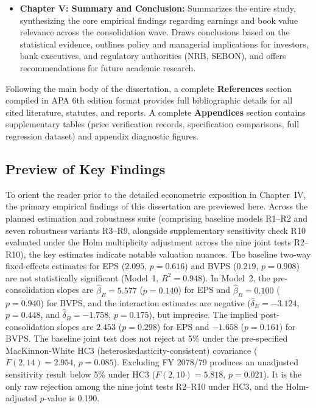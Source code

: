\begin{itemize}
\item \textbf{Chapter V: Summary and Conclusion:} Summarizes the entire study, synthesizing the core empirical findings regarding earnings and book value relevance across the consolidation wave. Draws conclusions based on the statistical evidence, outlines policy and managerial implications for investors, bank executives, and regulatory authorities (NRB, SEBON), and offers recommendations for future academic research.
\end{itemize}

Following the main body of the dissertation, a complete \textbf{References} section compiled in APA 6th edition format provides full bibliographic details for all cited literature, statutes, and reports. A complete \textbf{Appendices} section contains supplementary tables (price verification records, specification comparisons, full regression dataset) and appendix diagnostic figures.

\subsection{Preview of Key Findings}

To orient the reader prior to the detailed econometric exposition in Chapter~IV, the primary empirical findings of this dissertation are previewed here. Across the planned estimation and robustness suite (comprising baseline models R1--R2 and seven robustness variants R3--R9, alongside supplementary sensitivity check R10 evaluated under the Holm multiplicity adjustment across the nine joint tests R2--R10), the key estimates indicate notable valuation nuances. The baseline two-way fixed-effects estimates for EPS ($2.095$, $p=0.616$) and BVPS ($0.219$, $p=0.908$) are not statistically significant (Model~1, $R^2 = 0.948$). In Model~2, the pre-consolidation slopes are $\hat{\beta}_E = 5.577$ ($p=0.140$) for EPS and $\hat{\beta}_B = 0.100$ ($p=0.940$) for BVPS, and the interaction estimates are negative ($\hat{\delta}_E=-3.124$, $p=0.448$, and $\hat{\delta}_B=-1.758$, $p=0.175$), but imprecise. The implied post-consolidation slopes are $2.453$ ($p=0.298$) for EPS and $-1.658$ ($p=0.161$) for BVPS. The baseline joint test does not reject at 5\% under the pre-specified MacKinnon-White HC3 (heteroskedasticity-consistent) covariance ($F(2,14)=2.954$, $p=0.085$). Excluding FY 2078/79 produces an unadjusted sensitivity result below 5\% under HC3 ($F(2,10)=5.818$, $p=0.021$). It is the only raw rejection among the nine joint tests R2--R10 under HC3, and the Holm-adjusted $p$-value is 0.190.
